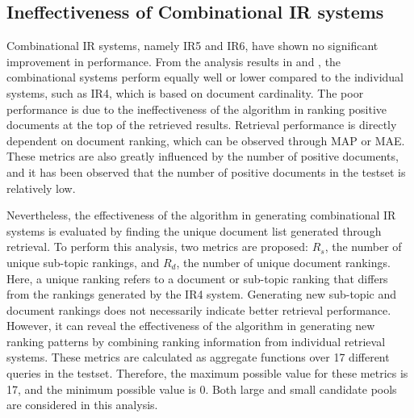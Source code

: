\subsection{Ineffectiveness of Combinational IR systems}

Combinational \ac{IR} systems, namely IR5 and IR6, have shown no significant improvement in performance. From the analysis results in  and , the combinational systems perform equally well or lower compared to the individual systems, such as IR4, which is based on document cardinality. The poor performance is due to the ineffectiveness of the algorithm in ranking positive documents at the top of the retrieved results. Retrieval performance is directly dependent on document ranking, which can be observed through MAP or MAE. These metrics are also greatly influenced by the number of positive documents, and it has been observed that the number of positive documents in the testset is relatively low.

Nevertheless, the effectiveness of the algorithm in generating combinational \ac{IR} systems is evaluated by finding the unique document list generated through retrieval. To perform this analysis, two metrics are proposed: $R_s$, the number of unique sub-topic rankings, and $R_d$, the number of unique document rankings. Here, a unique ranking refers to a document or sub-topic ranking that differs from the rankings generated by the IR4 system. Generating new sub-topic and document rankings does not necessarily indicate better retrieval performance. However, it can reveal the effectiveness of the algorithm in generating new ranking patterns by combining ranking information from individual retrieval systems. These metrics are calculated as aggregate functions over 17 different queries in the testset. Therefore, the maximum possible value for these metrics is 17, and the minimum possible value is 0. Both large and small candidate pools are considered in this analysis.

